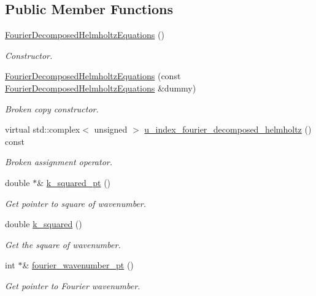\subsection*{Public Member Functions}
\begin{DoxyCompactItemize}
\item 
\hyperlink{classoomph_1_1FourierDecomposedHelmholtzEquations_ab9759d4c77f51eb7f2d64f7aba0833cb}{Fourier\+Decomposed\+Helmholtz\+Equations} ()
\begin{DoxyCompactList}\small\item\em Constructor. \end{DoxyCompactList}\item 
\hyperlink{classoomph_1_1FourierDecomposedHelmholtzEquations_a2d8eacb56de3a2d702352ed36ad162d0}{Fourier\+Decomposed\+Helmholtz\+Equations} (const \hyperlink{classoomph_1_1FourierDecomposedHelmholtzEquations}{Fourier\+Decomposed\+Helmholtz\+Equations} \&dummy)
\begin{DoxyCompactList}\small\item\em Broken copy constructor. \end{DoxyCompactList}\item 
virtual std\+::complex$<$ unsigned $>$ \hyperlink{classoomph_1_1FourierDecomposedHelmholtzEquations_aef9e1ca37fc4d939b9b94e59ddd7168d}{u\+\_\+index\+\_\+fourier\+\_\+decomposed\+\_\+helmholtz} () const
\begin{DoxyCompactList}\small\item\em Broken assignment operator. \end{DoxyCompactList}\item 
double $\ast$\& \hyperlink{classoomph_1_1FourierDecomposedHelmholtzEquations_a89722fcd358442bf9ea1f84b80fd1493}{k\+\_\+squared\+\_\+pt} ()
\begin{DoxyCompactList}\small\item\em Get pointer to square of wavenumber. \end{DoxyCompactList}\item 
double \hyperlink{classoomph_1_1FourierDecomposedHelmholtzEquations_a859c683de91b55aef60d1489978598b5}{k\+\_\+squared} ()
\begin{DoxyCompactList}\small\item\em Get the square of wavenumber. \end{DoxyCompactList}\item 
int $\ast$\& \hyperlink{classoomph_1_1FourierDecomposedHelmholtzEquations_a5ea7de8769feeb0b3617e279d80cd149}{fourier\+\_\+wavenumber\+\_\+pt} ()
\begin{DoxyCompactList}\small\item\em Get pointer to Fourier wavenumber. \end{DoxyCompactList}\item 

\end{DoxyCompactItemize}
